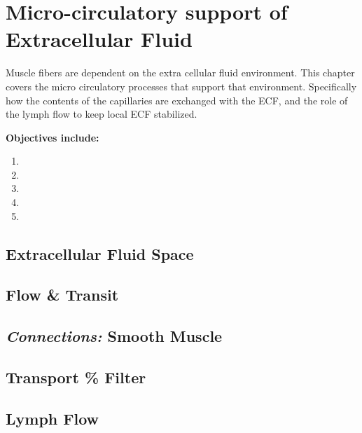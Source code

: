 \chapter{Micro-circulatory support of Extracellular Fluid}\label{chp:ecf_microcirculation}

\minitoc
Muscle fibers are dependent on the extra cellular fluid environment. This chapter covers the micro circulatory processes that support that environment. Specifically how the contents of the capillaries are exchanged with the ECF, and the role of the lymph flow to keep local ECF stabilized.

\vspace{5mm}

\textbf{Objectives include:}
\begin{enumerate}
    \item
    \item
    \item
    \item
    \item
\end{enumerate}

\section{Extracellular Fluid Space}

\section{Flow \& Transit}

\section{\textit{Connections:} Smooth Muscle}

\section{Transport \% Filter}

\section{Lymph Flow}

\printbibliography[heading=subbibintoc]
